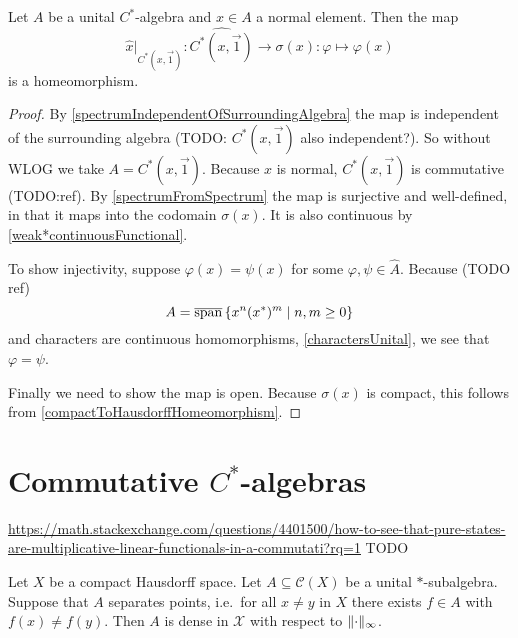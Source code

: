 \begin{proposition} \label{generatedAlgebraSpectrumHomeomorphism}
Let $A$ be a unital $C^*$-algebra and $x\in A$ a normal element. Then the map
\[ \hat{x}|_{\widehat{C^*(x,\vec{1})}}: \widehat{C^*(x,\vec{1})}\to \sigma(x): \varphi \mapsto \varphi(x) \]
is a homeomorphism.
\end{proposition}
\begin{proof}
By \ref{spectrumIndependentOfSurroundingAlgebra} the map is independent of the surrounding algebra (TODO: $C^*(x,\vec{1})$ also independent?). So without WLOG we take $A = C^*(x,\vec{1})$. Because $x$ is normal, $C^*(x,\vec{1})$ is commutative (TODO:ref). By \ref{spectrumFromSpectrum} the map is surjective and well-defined, in that it maps into the codomain $\sigma(x)$. It is also continuous by \ref{weak*continuousFunctional}.

To show injectivity, suppose $\varphi(x) = \psi(x)$ for some $\varphi,\psi\in\hat{A}$. Because (TODO ref)
\[ A = \overline{\operatorname{span}}\left\{ x^n(x^*)^m \;\middle|\; n,m\geq 0 \right\} \]
and characters are continuous homomorphisms, \ref{charactersUnital}, we see that $\varphi = \psi$.

Finally we need to show the map is open. Because $\sigma(x)$ is compact, this follows from \ref{compactToHausdorffHomeomorphism}.
\end{proof}

\section{Commutative $C^*$-algebras}
\url{https://math.stackexchange.com/questions/4401500/how-to-see-that-pure-states-are-multiplicative-linear-functionals-in-a-commutati?rq=1} TODO

\begin{theorem} \label{StoneWeierstrass}
Let $X$ be a compact Hausdorff space. Let $A\subseteq \mathcal{C}(X)$ be a unital $*$-subalgebra. Suppose that $A$ separates points, i.e.\ for all $x\neq y$ in $X$ there exists $f\in A$ with $f(x) \neq f(y)$. Then $A$ is dense in $\mathcal{X}$ with respect to $\lVert\cdot\rVert_\infty$.
\end{theorem}

